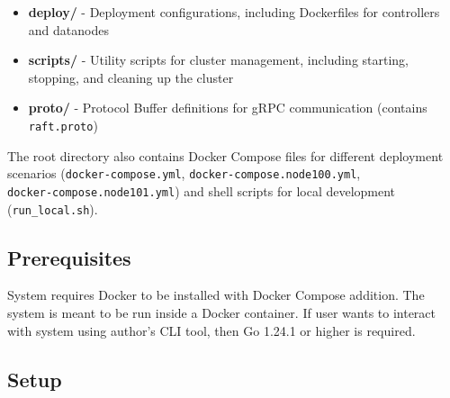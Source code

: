 \documentclass[shortabstract]{iithesis}
\begin{document}
\begin{itemize}
    \item \textbf{deploy/} - Deployment configurations, including Dockerfiles for controllers and datanodes
    
    \item \textbf{scripts/} - Utility scripts for cluster management, including starting, stopping, and cleaning up the cluster
    
    \item \textbf{proto/} - Protocol Buffer definitions for gRPC communication (contains \\ \texttt{raft.proto})

\end{itemize}

\noindent The root directory also contains Docker Compose files for different deployment scenarios (\texttt{docker-compose.yml}, \texttt{docker-compose.node100.yml}, \\ \texttt{docker-compose.node101.yml}) and shell scripts for local development\\ (\texttt{run\_local.sh}).

\subsection{Prerequisites}

System requires Docker to be installed with Docker Compose addition. The system is meant to be run inside a Docker container. If user wants to interact with system using author's CLI tool, then Go 1.24.1 or higher is required. 

\subsection{Setup}
\end{document}
